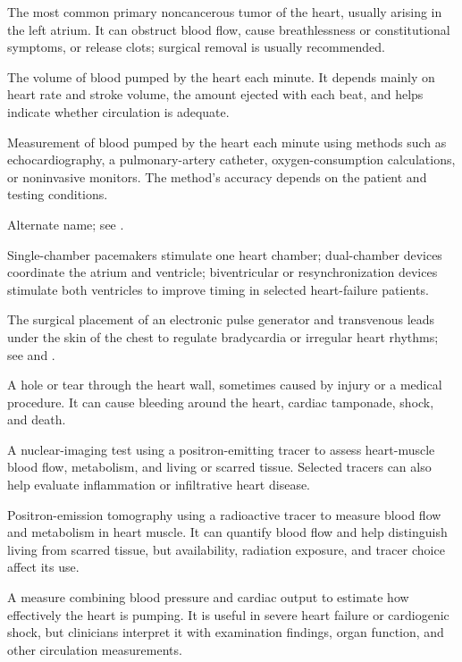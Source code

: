 The most common primary noncancerous tumor of the heart, usually arising in the left atrium. It can obstruct blood flow, cause breathlessness or constitutional symptoms, or release clots; surgical removal is usually recommended.

 The volume of blood pumped by the heart each minute. It depends mainly on heart rate and stroke volume, the amount ejected with each beat, and helps indicate whether circulation is adequate.

 Measurement of blood pumped by the heart each minute using methods such as echocardiography, a pulmonary-artery catheter, oxygen-consumption calculations, or noninvasive monitors. The method's accuracy depends on the patient and testing conditions.

 Alternate name; see .

 Single-chamber pacemakers stimulate one heart chamber; dual-chamber devices coordinate the atrium and ventricle; biventricular or resynchronization devices stimulate both ventricles to improve timing in selected heart-failure patients.

 The surgical placement of an electronic pulse generator and transvenous leads under the skin of the chest to regulate bradycardia or irregular heart rhythms; see  and .

 A hole or tear through the heart wall, sometimes caused by injury or a medical procedure. It can cause bleeding around the heart, cardiac tamponade, shock, and death.

 A nuclear-imaging test using a positron-emitting tracer to assess heart-muscle blood flow, metabolism, and living or scarred tissue. Selected tracers can also help evaluate inflammation or infiltrative heart disease.

 Positron-emission tomography using a radioactive tracer to measure blood flow and metabolism in heart muscle. It can quantify blood flow and help distinguish living from scarred tissue, but availability, radiation exposure, and tracer choice affect its use.

 A measure combining blood pressure and cardiac output to estimate how effectively the heart is pumping. It is useful in severe heart failure or cardiogenic shock, but clinicians interpret it with examination findings, organ function, and other circulation measurements.

